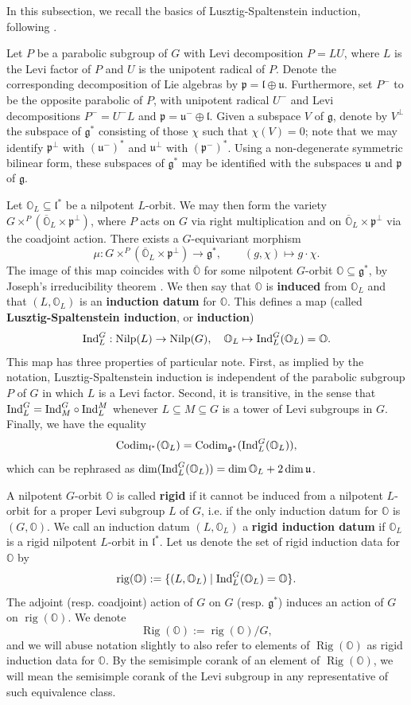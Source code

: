 \documentclass[11pt]{amsart}
\renewcommand{\O}{{\mathbb O}}
\newcommand{\g}{{\mathfrak g}}
\renewcommand{\l}{{\mathfrak l}}
\newcommand{\p}{{\mathfrak p}}
\renewcommand{\u}{{\mathfrak u}}
\newcommand{\Nilp}{\operatorname{Nilp}}
\newcommand{\rig}{\operatorname{rig}}
\newcommand{\Rig}{\operatorname{Rig}}
\newcommand{\Ind}{{{\mbox{\rm Ind}}}}
\newcommand{\codim}{{{\mbox{\rm Codim}}}}
\numberwithin{equation}{section}
\begin{document}
	In this subsection, we recall the basics of Lusztig-Spaltenstein induction, following \cite[\S 7]{CM}.
	
	Let $P$ be a parabolic subgroup of $G$ with Levi decomposition $P=LU$, where $L$ is the Levi factor of $P$ and $U$ is the unipotent radical of $P$. Denote the corresponding decomposition of Lie algebras by $\p=\l\oplus\u$. Furthermore, set $P^{-}$ to be the opposite parabolic of $P$, with unipotent radical $U^{-}$ and Levi decompositions $P^{-}=U^{-}L$ and $\p=\u^{-}\oplus\l$.  Given a subspace $V$ of $\g$, denote by $V^{\perp}$ the subspace of $\g^{*}$ consisting of those $\chi$ such that $\chi(V)=0$; note that we may identify $\p^{\perp}$ with $(\u^{-})^{*}$ and $\u^{\perp}$ with $(\p^{-})^{*}$. Using a non-degenerate symmetric bilinear form, these subspaces of $\g^{*}$ may be identified with the subspaces $\u$ and $\p$ of $\g$.
	
	Let $\O_L\subseteq \l^{*}$ be a nilpotent $L$-orbit. We may then form the variety $G\times^{P} (\overline{\O}_L\times \p^\perp)$, where $P$ acts on $G$ via right multiplication and on $\overline{\O}_L\times \p^\perp$ via the coadjoint action. There exists a $G$-equivariant morphism \begin{equation}\label{e: mu}
		\mu:G\times^{P} (\overline{\O}_L\times \p^\perp)\to \g^{*},\qquad (g,\chi)\mapsto g\cdot\chi.
	\end{equation} The image of this map coincides with $\overline{\O}$ for some nilpotent $G$-orbit $\O\subseteq \g^{*}$, by Joseph's irreducibility theorem \cite{JoAV}. We then say that $\O$ is {\bf induced} from $\O_L$ and that $(L,\O_L)$ is an {\bf induction datum} for $\O$. This defines a map (called {\bf Lusztig-Spaltenstein induction}, or {\bf induction}) $$\Ind_L^G:\Nilp(L)\to\Nilp(G), \quad \O_L\mapsto \Ind_L^G(\O_L)=\O.$$ This map has three properties of particular note. First, as implied by the notation, Lusztig-Spaltenstein induction is independent of the parabolic subgroup $P$ of $G$ in which $L$ is a Levi factor. Second, it is transitive, in the sense that $\Ind_L^G=\Ind_M^G\circ \Ind_L^M$ whenever $L\subseteq M\subseteq G$ is a tower of Levi subgroups in $G$. Finally, we have the equality $$\codim_{\l^{*}}(\O_L)=\codim_{\g^{*}}(\Ind_L^G(\O_L)),$$ which can be rephrased as $\dim(\Ind_L^G(\O_L))=\dim\O_L + 2\dim \u$.
	
	
	A nilpotent $G$-orbit $\O$ is called {\bf rigid} if it cannot be induced from a nilpotent $L$-orbit for a proper Levi subgroup $L$ of $G$, i.e. if the only induction datum for $\O$ is $(G,\O)$. We call an induction datum $(L,\O_L)$ a {\bf rigid induction datum} if $\O_L$ is a rigid nilpotent $L$-orbit in $\l^{*}$. Let us denote the set of rigid induction data for $\O$ by $$\rig(\O):=\{(L,\O_L)\mid \Ind_L^G(\O_L)=\O\}.$$ The adjoint (resp. coadjoint) action of $G$ on $G$ (resp. $\g^{*}$) induces an action of $G$ on $\rig(\O)$. We denote $$\Rig(\O):=\rig(\O)/ G,$$ and we will abuse notation slightly to also refer to elements of $\Rig(\O)$ as rigid induction data for $\O$. By the semisimple corank of an element of $\Rig(\O)$, we will mean the semisimple corank of the Levi subgroup in any representative of such equivalence class.
	
\end{document}
